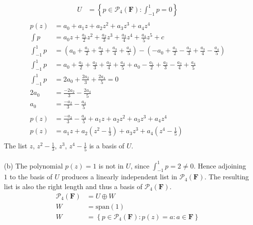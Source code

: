 \documentclass[a4paper]{article}
\begin{document}
\Large
\begin{align*}
\tag{a}
U &= \left\{ p \in \mathcal{P}_4(\textbf{F}) : \int_{-1}^1 p = 0 \right\} \\
\end{align*}
\begin{align*}
p(z)   &= a_0 + a_1z + a_2z^2 + a_3z^3 + a_4z^4 \\
\int p &= a_0z + \frac{a_1}{2}z^2 + \frac{a_2}{3}z^3 + \frac{a_3}{4}z^4 + \frac{a_4}{5}z^5 + c \\ 
\int_{-1}^1 p &= 
          \left( a_0 + \frac{a_1}{2} + \frac{a_2}{3} + \frac{a_3}{4} + \frac{a_4}{5}  \right) - 
          \left( -a_0 + \frac{a_1}{2} - \frac{a_2}{3} + \frac{a_3}{4} - \frac{a_4}{5}  \right)    \\
\int_{-1}^1 p &= a_0 + \frac{a_1}{2} + \frac{a_2}{3} + \frac{a_3}{4} + \frac{a_4}{5}  + a_0 - \frac{a_1}{2} + \frac{a_2}{3} - \frac{a_3}{4} + \frac{a_4}{5}     
\\
\int_{-1}^1 p &= 2a_0 + \frac{2a_2}{3} + \frac{2a_4}{5} =0
\\
2a_0 &= \frac{-2a_2}{3} - \frac{2a_4}{5} \\
a_0 &= \frac{-a_2}{3} - \frac{a_4}{5} \\
\\
p(z)   &= \frac{-a_2}{3} - \frac{a_4}{5} + a_1z + a_2z^2 + a_3z^3 + a_4z^4 \\
p(z)   &= a_1z + a_2\left(z^2-\frac{1}{3}\right) + a_3z^3 + a_4\left(z^4-\frac{1}{5}\right)\\
\end{align*}
The list $z$, $z^2-\frac{1}{3}$, $z^3$, $z^4-\frac{1}{5}$ is a basis of $U$.
\\
\\
(b) The polynomial $p(z)=1$ is not in $U$, since $\int_{-1}^1p=2\neq 0.$ Hence adjoining $1$ to the basis of $U$ produces a linearly independent list in $\mathcal{P}_4(\textbf{F})$. The resulting list is also the right length and thus a basis of $\mathcal{P}_4(\textbf{F})$.
\\
\begin{align*}
\tag{c}
\mathcal{P}_4(\textbf{F}) &= U \oplus W \\
W &= \text{span}(1) \\
 W &= \left\{ p \in \mathcal{P}_4(\textbf{F}) : p(z) = a : a \in \textbf{F} \right\}
\end{align*}
\end{document}
